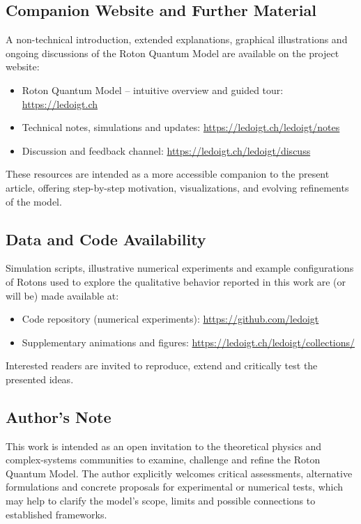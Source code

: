 \documentclass[11pt,a4paper]{article}
\begin{document}
\subsection*{Companion Website and Further Material}
A non-technical introduction, extended explanations, graphical illustrations and ongoing 
discussions of the Roton Quantum Model are available on the project website:
\begin{itemize}
  \item Roton Quantum Model – intuitive overview and guided tour: \url{https://ledoigt.ch}
  \item Technical notes, simulations and updates: \url{https://ledoigt.ch/ledoigt/notes}
  \item Discussion and feedback channel: \url{https://ledoigt.ch/ledoigt/discuss}
\end{itemize}
These resources are intended as a more accessible companion to the present article, 
offering step-by-step motivation, visualizations, and evolving refinements of the model.

\subsection*{Data and Code Availability}
Simulation scripts, illustrative numerical experiments and example configurations of Rotons 
used to explore the qualitative behavior reported in this work are (or will be) made available at:
\begin{itemize}
  \item Code repository (numerical experiments): \url{https://github.com/ledoigt}
  \item Supplementary animations and figures: \url{https://ledoigt.ch/ledoigt/collections/}
\end{itemize}
Interested readers are invited to reproduce, extend and critically test the presented ideas.

\subsection*{Author’s Note}
This work is intended as an open invitation to the theoretical physics and complex-systems 
communities to examine, challenge and refine the Roton Quantum Model. The author 
explicitly welcomes critical assessments, alternative formulations and concrete proposals 
for experimental or numerical tests, which may help to clarify the model’s scope, limits 
and possible connections to established frameworks.
\end{document}
